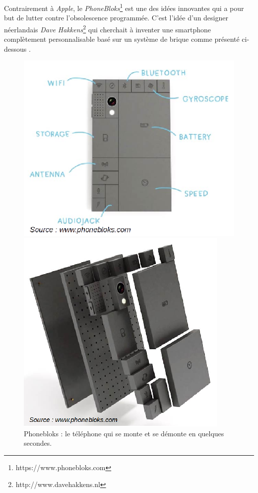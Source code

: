 \bigbreak
Contrairement à \textit{Apple}, le \textit{PhoneBloks}\footnote{https://www.phonebloks.com} est une des idées innovantes qui a pour but de lutter contre l'obsolescence programmée. C'est l'idée d'un designer néerlandais \textit{Dave Hakkens}\footnote{http://www.davehakkens.nl} qui cherchait à inventer une smartphone complètement personnalisable basé sur un système de brique comme présenté ci-dessous \cite{op_pb}.
\begin{figure}[h]
\begin{minipage}{0.5\linewidth}
\begin{center}
\includegraphics[scale=0.6]{Rsc/phonebloks2.png} 
\end{center}
\end{minipage}
\begin{minipage}{0.5\linewidth}
\begin{center}
\includegraphics[scale=0.7]{Rsc/phonebloks1.png} 
\end{center}
\end{minipage}
\caption{\scriptsize{Phonebloks : le téléphone qui se monte et se démonte en quelques secondes.}}
\label{phonebloks}
\end{figure}


